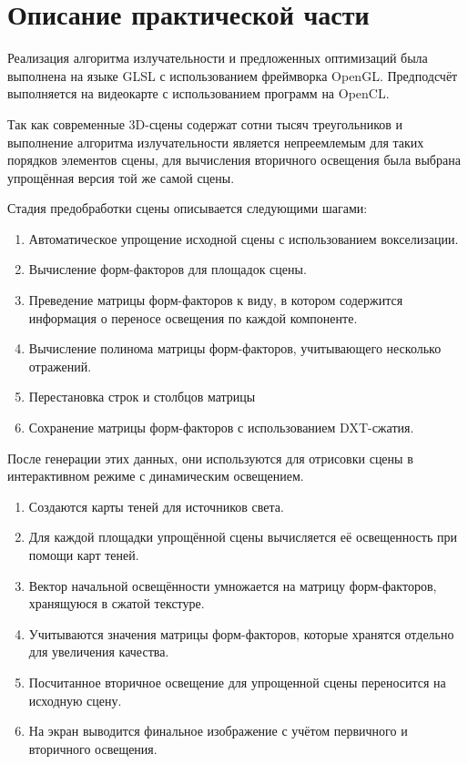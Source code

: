 \documentclass[12pt,fleqn]{article}
\begin{document}
\section{Описание практической части}

Реализация алгоритма излучательности и предложенных оптимизаций была выполнена на языке GLSL с использованием фреймворка OpenGL. Предподсчёт выполняется на видеокарте с использованием программ на OpenCL. 

Так как современные 3D-сцены содержат сотни тысяч треугольников и выполнение алгоритма излучательности является непреемлемым для таких порядков элементов сцены, для вычисления вторичного освещения была выбрана упрощённая версия той же самой сцены.

Стадия предобработки сцены описывается следующими шагами:

\begin{enumerate}

\item Автоматическое упрощение исходной сцены с использованием вокселизации.

\item Вычисление форм-факторов для площадок сцены.

\item Преведение матрицы форм-факторов к виду, в котором содержится информация о переносе освещения по каждой компоненте.

\item Вычисление полинома матрицы форм-факторов, учитывающего несколько отражений.

\item Перестановка строк и столбцов матрицы

\item Сохранение матрицы форм-факторов с использованием DXT-сжатия.

\end{enumerate}

После генерации этих данных, они используются для отрисовки сцены в интерактивном режиме с динамическим освещением.

\begin{enumerate}

\item Создаются карты теней для источников света.

\item Для каждой площадки упрощённой сцены вычисляется её освещенность при помощи карт теней.

\item Вектор начальной освещённости умножается на матрицу форм-факторов, хранящуюся в сжатой текстуре.

\item Учитываются значения матрицы форм-факторов, которые хранятся отдельно для увеличения качества.

\item Посчитанное вторичное освещение для упрощенной сцены переносится на исходную сцену.

\item На экран выводится финальное изображение с учётом первичного и вторичного освещения.

\end{enumerate}
\end{document}
